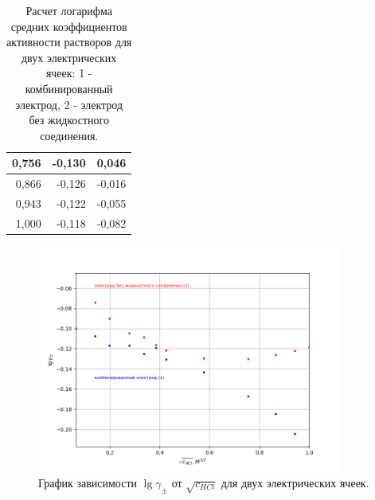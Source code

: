 \documentclass[a4paper,12pt]{article}
\begin{document}
\begin{enumerate}
\begin{table}[h!]
\begin{tabular}{|r|r|r|}
0,756                                              & -0,130                                                                                              & 0,046                                                                                                                      \\ \hline
0,866                                              & -0,126                                                                                             & -0,016                                                                                                                     \\ \hline
0,943                                              & -0,122                                                                                             & -0,055                                                                                                                     \\ \hline
1,000                                                  & -0,118                                                                                             & -0,082                                                                                                                     \\ \hline
\end{tabular}
\caption{Расчет логарифма средних коэффициентов активности растворов для двух электрических ячеек:  1 - комбинированный электрод, 2 - электрод без жидкостного соединения.}
\label{tab:my-table}
\end{table}

\begin{figure}[h!]
    \centering
    \includegraphics[width=10cm]{Figure_4.png}
    \caption{ График зависимости $\lg \gamma_{\pm}$ от $\sqrt {c_{HCl}}$ для двух электрических ячеек.}
    \label{fig:vac}
\end{figure}

\end{enumerate}
\end{document}
